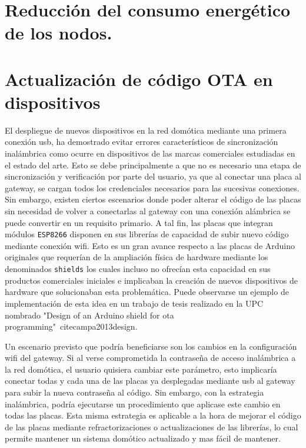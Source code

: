 \section{Reducción del consumo energético de los nodos.}
\label{ch:Capitulo6.3}


\section{Actualización de código OTA en dispositivos}
\label{ch:Capitulo6.4}
El despliegue de nuevos dispositivos en la red domótica mediante una primera conexión \gls{usb}, ha demostrado evitar errores característicos de sincronización inalámbrica como ocurre en dispositivos de las marcas comerciales estudiadas en el estado del arte. Esto se debe principalmente a que no es necesario una etapa de sincronización y verificación por parte del usuario, ya que al conectar una placa al \gls{gateway}, se cargan todos los credenciales necesarios para las sucesivas conexiones. Sin embargo, existen ciertos escenarios donde poder alterar el código de las placas sin necesidad de volver a conectarlas al \gls{gateway} con una conexión alámbrica se puede convertir en un requisito primario. A tal fin, las placas que integran módulos \verb|ESP8266| disponen en sus librerías de capacidad de subir nuevo código mediante conexión \gls{wifi}. Esto es un gran avance respecto a las placas de Arduino originales que requerían de la ampliación física de hardware mediante los denominados \verb|shields| los cuales incluso no ofrecían esta capacidad en sus productos comerciales iniciales e implicaban la creación de nuevos dispositivos de hardware que solucionaban esta problemática. Puede observarse un ejemplo de implementación de esta idea en un trabajo de tesis realizado en la UPC nombrado "Design of an Arduino shield for ota programming"~cite{campa2013design}.

\vspace{1cm}

Un escenario previsto que podría beneficiarse son los cambios en la configuración \gls{wifi} del \gls{gateway}. Si al verse comprometida la contraseña de acceso inalámbrica a la red domótica, el usuario quisiera cambiar este parámetro, esto implicaría conectar todas y cada una de las placas ya desplegadas mediante \gls{usb} al \gls{gateway} para subir la nueva contraseña al código. Sin embargo, con la estrategia inalámbrica, podría ejecutarse un procedimiento que aplicase este cambio en todas las placas. Esta misma estrategia es aplicable a la hora de mejorar el código de las placas mediante refractorizaciones o actualizaciones de las librerías, lo cual permite mantener un sistema domótico actualizado y mas fácil de mantener.

